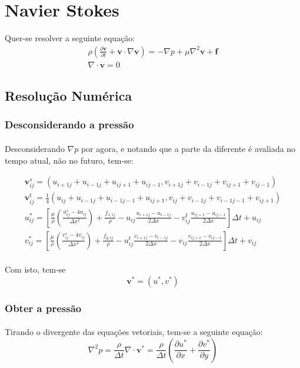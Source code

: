 \documentclass[a4paper,11pt]{article}
\title{}
\author{Ataias Reis}
\begin{document}
\section{Navier Stokes}
Quer-se resolver a seguinte equação:
\begin{eqnarray}
\rho\left( \frac{\partial \textbf{v}}{\partial t}+\textbf{v}\cdot\nabla\textbf{v}\right)=-\nabla p+\mu\nabla^2\textbf{v}+\textbf{f}\\
\nabla\cdot \textbf{v}=0
\end{eqnarray}
\subsection{Resolução Numérica}
\subsubsection{Desconsiderando a pressão}
\paragraph{} Desconsiderando $\nabla p$ por agora, e notando que a parte da diferente é avaliada no tempo atual, não no futuro, tem-se:

\begin{eqnarray}
\textbf{v}_{ij}^s=(u_{i+1j}+u_{i-1j}+u_{ij+1}+u_{ij-1},v_{i+1j}+v_{i-1j}+v_{ij+1}+v_{ij-1})\\
\textbf{v}_{ij}^t=\frac{1}{4}(u_{ij}+u_{i-1j}+u_{i-1j-1}+u_{ij+1},v_{ij}+v_{i-1j}+v_{i-1j-1}+v_{ij+1})\\
u_{ij}^{*}=\left[\frac{\mu}{\rho}\left(\frac{u_{ij}^s-4u_{ij}}{\Delta x^2}\right)+\frac{f_{x,ij}}{\rho}-u_{ij}\frac{u_{i+1j}-u_{i-1j}}{2\Delta x}-v_{ij}^t\frac{u_{ij+1}-u_{ij-1}}{2\Delta x}\right]\Delta t + u_{ij}\\
v_{ij}^{*}=\left[\frac{\mu}{\rho}\left(\frac{v_{ij}^s-4v_{ij}}{\Delta x^2}\right)+\frac{f_{y,ij}}{\rho}-u_{ij}^t\frac{v_{i+1j}-v_{i-1j}}{2\Delta x}-v_{ij}\frac{v_{ij+1}-v_{ij-1}}{2\Delta x}\right]\Delta t + v_{ij}
\end{eqnarray}

\paragraph{} Com isto, tem-se \[\textbf{v}^{*}=(u^*,v^*)\]
\subsubsection{Obter a pressão}
\paragraph{} Tirando o divergente das equações vetoriais, tem-se a seguinte equação:
\begin{equation}
\nabla^2 p = \frac{\rho}{\Delta t} \nabla\cdot \textbf{v}^*=\frac{\rho}{\Delta t} 
\left( \frac{\partial u^*}{\partial x}+\frac{\partial v^*}{\partial y} \right)
\end{equation}
\end{document}

